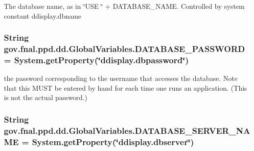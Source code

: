 The database name, as in \char`\"{}\-U\-S\-E \char`\"{} + D\-A\-T\-A\-B\-A\-S\-E\-\_\-\-N\-A\-M\-E. Controlled by system constant ddisplay.\-dbname \hypertarget{classgov_1_1fnal_1_1ppd_1_1dd_1_1GlobalVariables_ae63bd973c9c02683b0c4964179ceefe0}{
\subsubsection[{D\-A\-T\-A\-B\-A\-S\-E\-\_\-\-P\-A\-S\-S\-W\-O\-R\-D}]{\setlength{\rightskip}{0pt plus 5cm}String gov.\-fnal.\-ppd.\-dd.\-Global\-Variables.\-D\-A\-T\-A\-B\-A\-S\-E\-\_\-\-P\-A\-S\-S\-W\-O\-R\-D = System.\-get\-Property(\char`\"{}ddisplay.\-dbpassword\char`\"{})\hspace{0.3cm}{\ttfamily [static]}}}\label{classgov_1_1fnal_1_1ppd_1_1dd_1_1GlobalVariables_ae63bd973c9c02683b0c4964179ceefe0}
the password corresponding to the username that accesses the database. Note that this M\-U\-S\-T be entered by hand for each time one runs an application. (This is not the actual password.) \hypertarget{classgov_1_1fnal_1_1ppd_1_1dd_1_1GlobalVariables_a84bb07dcee9c961579282f50a5031c0e}{
\subsubsection[{D\-A\-T\-A\-B\-A\-S\-E\-\_\-\-S\-E\-R\-V\-E\-R\-\_\-\-N\-A\-M\-E}]{\setlength{\rightskip}{0pt plus 5cm}String gov.\-fnal.\-ppd.\-dd.\-Global\-Variables.\-D\-A\-T\-A\-B\-A\-S\-E\-\_\-\-S\-E\-R\-V\-E\-R\-\_\-\-N\-A\-M\-E = System.\-get\-Property(\char`\"{}ddisplay.\-dbserver\char`\"{})\hspace{0.3cm}{\ttfamily [static]}}}\label{classgov_1_1fnal_1_1ppd_1_1dd_1_1GlobalVariables_a84bb07dcee9c961579282f50a5031c0e}

